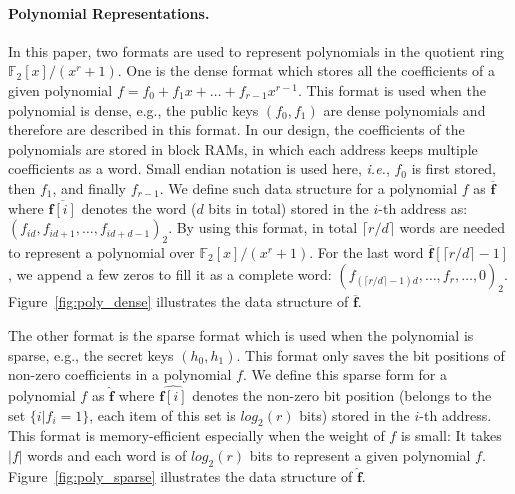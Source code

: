 \documentclass[runningheads]{llncs}
\begin{document}
\paragraph{Polynomial Representations.}
In this paper, two formats are used to represent polynomials in
the quotient ring $\mathbb{F}_2[x]/(x^r+1)$.
One is the dense format which stores all the coefficients
of a given polynomial $f=f_0+f_1x+\ldots +f_{r-1}x^{r-1}$. %
This format is used when the polynomial is dense, e.g.,
the public keys $(f_0, f_1)$ are dense polynomials
and therefore are described in this format.
In our design, the coefficients of the polynomials are
stored in block RAMs, in which each address keeps multiple coefficients as a word.
Small endian notation is used here, \textit{i.e.}, $f_0$ is first stored, then $f_1$, and finally $f_{r-1}$.
We define such data structure for a polynomial $f$ as $\overline{\mathbf{f}}$
where $\overline{\mathbf{f}[i]}$ denotes the word ($d$ bits in total) stored in the $i$-th address as: $(f_{id},f_{id+1},\ldots,f_{id+d-1})_2$.
By using this format, in total $\lceil r/d \rceil$ words
are needed to represent a polynomial over $\mathbb{F}_2[x]/(x^r+1)$.
For the last word  $\mathbf{\overline{f}}[\lceil r/d \rceil-1]$,
we append a few zeros to fill it as a complete word:
$(f_{(\lceil r/d\rceil-1)d},\ldots, f_{r},\ldots,0)_2$.
Figure~\ref{fig:poly_dense} illustrates the data structure of $\overline{\mathbf{f}}$.

The other format is the sparse format which is used
when the polynomial is sparse, e.g.,
the secret keys $(h_0, h_1)$.
This format only saves the bit positions of non-zero coefficients in a polynomial $f$.
We define this sparse form for a polynomial $f$ as $\mathbf{\hat{f}}$ where
$\hat{\mathbf{f}[i]}$ denotes the non-zero bit position (belongs to the set $\{i|f_i=1\}$, each item of this set is $log_2(r)$ bits) stored in the $i$-th address.
This format is memory-efficient especially when
the weight of $f$ is small:
It takes $|f|$ words and each word is of $log_2(r)$ bits to
represent a given polynomial $f$. %
Figure~\ref{fig:poly_sparse} illustrates the data structure of $\mathbf{\hat{f}}$.
\end{document}
